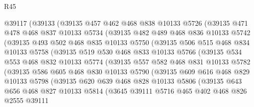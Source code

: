 \begin{lexlean}{R45}
\begin{coremodule}
    @39117
      (@39133
        (@39135
          @457
          @462
          @468
          @838
          @10133
          @5726
          (@39135
            @471
            @478
            @468
            @837
            @10133
            @5734
            (@39135
              @482
              @489
              @468
              @836
              @10133
              @5742
              (@39135
                @493
                @502
                @468
                @835
                @10133
                @5750
                (@39135
                  @506
                  @515
                  @468
                  @834
                  @10133
                  @5758
                  (@39135
                    @519
                    @530
                    @468
                    @833
                    @10133
                    @5766
                    (@39135
                      @534
                      @553
                      @468
                      @832
                      @10133
                      @5774
                      (@39135
                        @557
                        @582
                        @468
                        @831
                        @10133
                        @5782
                        (@39135
                          @586
                          @605
                          @468
                          @830
                          @10133
                          @5790
                          (@39135
                            @609
                            @616
                            @468
                            @829
                            @10133
                            @5798
                            (@39135
                              @620
                              @639
                              @468
                              @828
                              @10133
                              @5806
                              (@39135
                                @643
                                @656
                                @468
                                @827
                                @10133
                                @5814
                                (@3645
                                  @39111
                                  @5716
                                  @465
                                  @402
                                  @468
                                  @826
                                  @2555
                                  @39111

\end{coremodule}
\end{lexlean}
